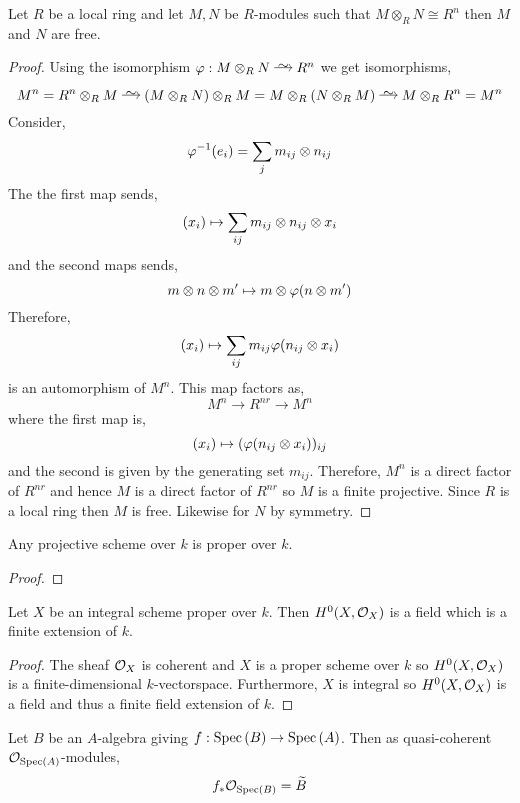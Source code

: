 \documentclass[12pt]{article}
\begin{document}
\begin{lemma} \label{tensor_inverse}
Let $R$ be a local ring and let $M, N$ be $R$-modules such that $M \otimes_R N \cong R^n$ then $M$ and $N$ are free.
\end{lemma}

\begin{proof}
Using the isomorphism $\varphi : M \ot_R N \iso R^n$ we get isomorphisms,
\[ M^n = R^n \ot_R M \iso (M \ot_R N) \ot_R M = M \ot_R (N \ot_R M) \iso M \ot_R R^n = M^n \]
Consider,
\[ \varphi^{-1}(e_i) = \sum_j m_{ij} \otimes n_{ij} \]
The the first map sends,
\[ (x_i) \mapsto \sum_{ij} m_{ij} \otimes n_{ij} \otimes x_i \]
and the second maps sends,
\[ m \otimes n \otimes m' \mapsto m \otimes \varphi(n \otimes m') \]
Therefore, 
\[ (x_i) \mapsto \sum_{ij} m_{ij} \varphi(n_{ij} \otimes x_i) \]
is an automorphism of $M^n$. This map factors as,
\[ M^n \to R^{nr} \to M^n \]
where the first map is,
\[ (x_i) \mapsto (\varphi(n_{ij} \otimes x_i))_{ij} \]
and the second is given by the generating set $m_{ij}$. Therefore, $M^n$ is a direct factor of $R^{nr}$ and hence $M$ is a direct factor of $R^{nr}$ so $M$ is a finite projective. Since $R$ is a local ring then $M$ is free. Likewise for $N$ by symmetry. 
\end{proof}

\begin{lemma} \label{projective_scheme_proper}
Any projective scheme over $k$ is proper over $k$.
\end{lemma}

\begin{proof}

\end{proof}

\begin{lemma} \label{global_sections_proper_scheme}
Let $X$ be an integral scheme proper over $k$. Then $H^0(X, \mathcal{O}_{X})$ is a field which is a finite extension of $k$. 
\end{lemma}

\begin{proof}
The sheaf $\mathcal{O}_{X}$ is coherent and $X$ is a proper scheme over $k$ so $H^0(X, \mathcal{O}_{X})$ is a finite-dimensional $k$-vectorspace. Furthermore, $X$ is integral so $H^0(X, \mathcal{O}_{X})$ is a field and thus a finite field extension of $k$.
\end{proof}

\begin{lemma}
Let $B$ be an $A$-algebra giving $f : \mathrm{Spec}\left( B \right) \to \mathrm{Spec}\left( A \right)$. Then as quasi-coherent $\mathcal{O}_{\mathrm{Spec}\left( A \right)}$-modules,
 \[ f_* \mathcal{O}_{\mathrm{Spec}\left( B \right)} = \widetilde{B} \]
\end{lemma}
\end{document}
